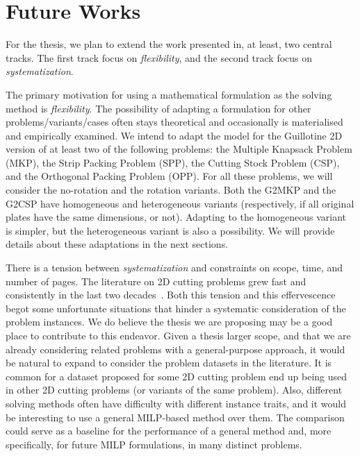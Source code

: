 \documentclass[ppgc,prop-tese,english,formais,babel]{iiufrgs}
\begin{document}

\chapter{Future Works}
\label{sec:future_works}

For the thesis, we plan to extend the work presented in, at least, two central tracks.
The first track focus on \emph{flexibility}, and the second track focus on \emph{systematization}.

The primary motivation for using a mathematical formulation as the solving method is \emph{flexibility}.
The possibility of adapting a formulation for other problems/variants/cases often stays theoretical and occasionally is materialised and empirically examined.
We intend to adapt the model for the Guillotine 2D version of at least two of the following problems:
the Multiple Knapsack Problem (MKP), the Strip Packing Problem (SPP), the Cutting Stock Problem (CSP), and the Orthogonal Packing Problem (OPP).
For all these problems, we will consider the no-rotation and the rotation variants.
Both the G2MKP and the G2CSP have homogeneous and heterogeneous variants (respectively, if all original plates have the same dimensions, or not).
Adapting to the homogeneous variant is simpler, but the heterogeneous variant is also a possibility.
We will provide details about these adaptations in the next sections.

There is a tension between \emph{systematization} and constraints on scope, time, and number of pages.
The literature on 2D cutting problems grew fast and consistently in the last two decades~\citep{iori:2020}.
Both this tension and this effervescence begot some unfortunate situations that hinder a systematic consideration of the problem instances.
We do believe the thesis we are proposing may be a good place to contribute to this endeavor.
Given a thesis larger scope, and that we are already considering related problems with a general-purpose approach, it would be natural to expand to consider the problem datasets in the literature.
It is common for a dataset proposed for some 2D cutting problem end up being used in other 2D cutting problems (or variants of the same problem).
Also, different solving methods often have difficulty with different instance traits, and it would be interesting to use a general MILP-based method over them.
The comparison could serve as a baseline for the performance of a general method and, more specifically, for future MILP formulations, in many distinct problems.
\end{document}
